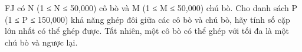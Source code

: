 FJ có N (1 ≤ N ≤ 50,000) cô bò và M (1 ≤ M ≤ 50,000) chú bò. Cho danh sách P (1 ≤ P ≤ 150,000) khả năng ghép đôi giữa các cô bò và chú bò, hãy tính số cặp lớn nhất có thể ghép được. Tất nhiên, một cô bò có thể ghép với tối đa là một chú bò và ngược lại.  

\